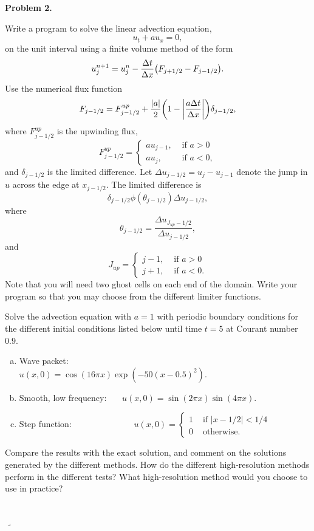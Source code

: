 \documentclass[12pt]{article}
\newenvironment{myprob}[1]
    {%
    \noindent{\Huge$\ulcorner$}\textbf{#1.}\begin{em}
    }
    { 
    \end{em} \\ \hphantom{l} \hfill {\Huge$\lrcorner$} }
\begin{document}
\begin{myprob}{Problem 2}
Write a program to solve the linear advection equation,
$$u_t + a u_x = 0,$$
on the unit interval using a finite volume method of the form
$$u_j^{n+1} = u_j^n - \dfrac{\Delta t}{\Delta x}\qty(F_{j+1/2} - F_{j-1/2}). $$
Use the numerical flux function
$$F_{j-1/2} = F^{up}_{j-1/2} + \dfrac{|a|}{2}\qty(1-\qty|\dfrac{a\Delta t}{\Delta x}|)\delta_{j-1/2},$$
where $F^{up}_{j-1/2}$ is the upwinding flux,
$$F^{up}_{j-1/2} = \begin{cases}a u_{j-1}, & \text{ if } a>0 \\ 
					a u_{j}, & \text{ if } a<0, \end{cases}$$
and $\delta_{j-1/2}$ is the limited difference.  Let $\Delta u_{j-1/2}=u_j - u_{j-1}$ denote the jump in $u$ across the edge at $x_{j-1/2}$.  The limited difference is 
$$\delta_{j-1/2} \phi(\theta_{j-1/2})\Delta u_{j-1/2}, $$ 
where $$\theta_{j-1/2} = \dfrac{\Delta u_{J_{up}-1/2}}{\Delta u_{j-1/2}}, $$
and $$J_{up} = \begin{cases} j-1, & \text{ if } a>0 \\
							 j+1, & \text{ if } a<0 . \end{cases} $$
Note that you will need two ghost cells on each end of the domain. Write your program so that you may choose from the different limiter functions.

Solve the advection equation with $a = 1$ with periodic boundary conditions for the different initial conditions listed below until time $t = 5$ at Courant number $0.9$.
\begin{enumerate}[(a)]
\item Wave packet: \ \ \ \ \ \ \ \ \ \ \  \ \ \ \ $u(x,0) = \cos(16\pi x)\exp(-50(x-0.5)^2).$
\item Smooth, low frequency: \  \ \ $u(x,0) = \sin(2\pi x)\sin(4 \pi x).$
\item Step function: \ \ \  \ \ \ \ \ \ \  \ \ \ \  $u(x,0) = \begin{cases} 1 & \text{ if } |x-1/2|<1/4 \\ 0 & \text{ otherwise.} \end{cases}$
\end{enumerate}
Compare the results with the exact solution, and comment on the solutions generated by the different methods. How do the different high-resolution methods perform in the different tests? What high-resolution method would you choose to use in practice?
\end{myprob}
\end{document}
